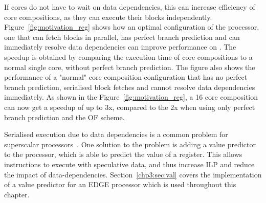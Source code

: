 If cores do not have to wait on data dependencies, this can increase efficiency of core compositions, as they can execute their blocks independently.
Figure~\ref{fig:motivation_reg} shows how an optimal configuration of the processor, one that can fetch blocks in parallel, has perfect branch prediction and can immediately resolve data dependencies can improve performance on .
The speedup is obtained by comparing the execution time of core compositions to a normal single core, without perfect branch prediction.
The figure also shows the performance of a "normal" core composition configuration that has no perfect branch prediction, serialised block fetches and cannot resolve data dependencies immediately.
As shown in the Figure~\ref{fig:motivation_reg}, a 16 core composition can now get a speedup of up to 3x, compared to the 2x when using only perfect branch prediction and the OF scheme.

Serialised execution due to data dependencies is a common problem for superscalar processors~\cite{peraisVTAGE2014}.
One solution to the problem is adding a value predictor to the processor, which is able to predict the value of a register.
This allows instructions to execute with speculative data, and thus increase ILP and reduce the impact of data-dependencies.
Section~\ref{chp3:sec:val} covers the implementation of a value predictor for an EDGE processor which is used throughout this chapter.






